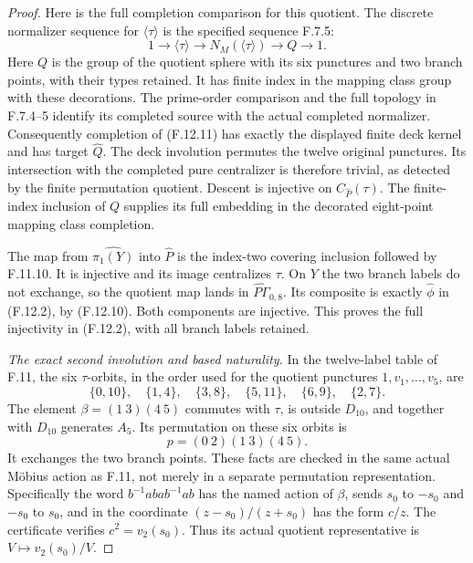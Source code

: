 \begin{proof}
Here is the full completion comparison for
this quotient.  The discrete normalizer
sequence for $\langle\tau\rangle$ is the
specified sequence F.7.5:
\[
 1\longrightarrow\langle\tau\rangle
 \longrightarrow N_M(\langle\tau\rangle)
 \longrightarrow Q\longrightarrow1 .
                                                               \tag{F.12.11}
\]
Here $Q$ is the group of the quotient sphere
with its six punctures and two branch points,
with their types retained.  It has finite
index in the mapping class group with these
decorations.  The prime-order comparison and
the full topology in F.7.4--5 identify its
completed source with the actual completed
normalizer.  Consequently completion of
(F.12.11) has exactly the displayed finite
deck kernel and has target $\widehat Q$.
The deck involution permutes the twelve
original punctures.  Its intersection with
the completed pure centralizer is therefore
trivial, as detected by the finite permutation
quotient.  Descent is injective on
$C_{\widehat P}(\tau)$.
The finite-index inclusion of $Q$ supplies
its full embedding in the decorated
eight-point mapping class completion.

The map from $\widehat{\pi_1(Y)}$ into
$\widehat P$ is the index-two covering
inclusion followed by F.11.10.
It is injective and its image centralizes
$\tau$.  On $Y$ the two branch labels do
not exchange, so the quotient map lands
in $\widehat{P\Gamma}_{0,8}$.
Its composite is exactly
$\widehat\phi$ in (F.12.2), by (F.12.10).
Both components are injective.  This
proves the full injectivity in (F.12.2),
with all branch labels retained.

\emph{The exact second involution and based naturality.}
In the twelve-label table of F.11, the six
$\tau$-orbits, in the order used for the
quotient punctures $1,v_1,\ldots,v_5$, are
\[
 \{0,10\},\quad\{1,4\},\quad\{3,8\},\quad
              \{5,11\},\quad\{6,9\},\quad\{2,7\}.
                                                               \tag{F.12.12}
\]
The element $\beta=(1\ 3)(4\ 5)$ commutes
with $\tau$, is outside $D_{10}$, and
together with $D_{10}$ generates $A_5$.
Its permutation on these six orbits is
\[
              p=(0\ 2)(1\ 3)(4\ 5).
                                                               \tag{F.12.13}
\]
It exchanges the two branch points.
These facts are checked in the same actual
M\"obius action as F.11, not merely in a
separate permutation representation.
Specifically the word
$b^{-1}aba b^{-1}ab$ has the named action
of $\beta$, sends $s_0$ to $-s_0$ and
$-s_0$ to $s_0$, and in the coordinate
$(z-s_0)/(z+s_0)$ has the form $c/z$.
The certificate verifies $c^2=v_2(s_0)$.
Thus its actual quotient representative is
$V\mapsto v_2(s_0)/V$.


\end{proof}
